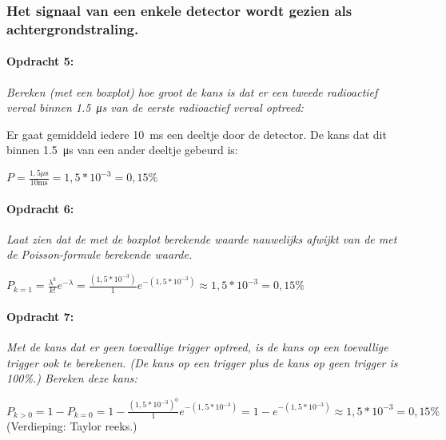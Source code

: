 \subsubsection{Het signaal van een enkele detector wordt gezien als achtergrondstraling.}

\begin{minipage}[t]{1\columnwidth}%

\paragraph{Opdracht 5:}

\textit{Bereken (met een boxplot) hoe groot de kans is dat er een
tweede radioactief verval binnen \SI{1.5}{\micro\second} van de eerste
radioactief verval optreed:}

\bigskip{}


Er gaat gemiddeld iedere \SI{10}{\milli\second} een deeltje door
de detector. De kans dat dit binnen \SI{1.5}{\micro\second} van een
ander deeltje gebeurd is:

\bigskip{}


$P=\frac{1,5\mu\mathrm{s}}{10\mathrm{ms}}=1,5*10^{-3}=0,15\%$%
\end{minipage}

\bigskip{}


\begin{minipage}[t]{1\columnwidth}%

\paragraph{Opdracht 6:}

\textit{Laat zien dat de met de boxplot berekende waarde nauwelijks
afwijkt van de met de Poisson-formule berekende waarde.}

\bigskip{}


$P_{k=1}=\frac{\lambda^{k}}{k!}e^{-\lambda}=\frac{\left(1,5*10^{-3}\right)}{1}e^{-\left(1,5*10^{-3}\right)}\approx1,5*10^{-3}=0,15\%$%
\end{minipage}

\bigskip{}


\begin{minipage}[t]{1\columnwidth}%

\paragraph{Opdracht 7:}

\textit{Met de kans dat er geen toevallige trigger optreed, is de
kans op een toevallige trigger ook te berekenen. (De kans op een trigger
plus de kans op geen trigger is 100\%.) Bereken deze kans:}

\bigskip{}


$P_{k>0}=1-P_{k=0}=1-\frac{\left(1,5*10^{-3}\right)^{0}}{1}e^{-\left(1,5*10^{-3}\right)}=1-e^{-\left(1,5*10^{-3}\right)}\approx1,5*10^{-3}=0,15\%$
(Verdieping: Taylor reeks.)%
\end{minipage}

